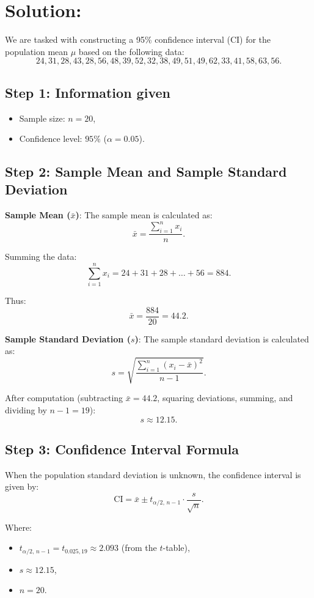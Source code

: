 \documentclass{article}
\begin{document}
\section*{Solution:}

We are tasked with constructing a 95\% confidence interval (CI) for the population mean \(\mu\) based on the following data:
\[
24, 31, 28, 43, 28, 56, 48, 39, 52, 32, 38, 49, 51, 49, 62, 33, 41, 58, 63, 56.
\]

\subsection*{Step 1: Information given}
\begin{itemize}
    \item Sample size: \(n = 20\),
    \item Confidence level: \(95\%\) (\(\alpha = 0.05\)).
\end{itemize}

\subsection*{Step 2: Sample Mean and Sample Standard Deviation}
\textbf{Sample Mean (\(\bar{x}\))}: The sample mean is calculated as:
\[
\bar{x} = \frac{\sum_{i=1}^{n} x_i}{n}.
\]

Summing the data:
\[
\sum_{i=1}^{n} x_i = 24 + 31 + 28 + \dots + 56 = 884.
\]

Thus:
\[
\bar{x} = \frac{884}{20} = 44.2.
\]

\textbf{Sample Standard Deviation (\(s\))}: The sample standard deviation is calculated as:
\[
s = \sqrt{\frac{\sum_{i=1}^{n} (x_i - \bar{x})^2}{n - 1}}.
\]

After computation (subtracting \(\bar{x} = 44.2\), squaring deviations, summing, and dividing by \(n-1 = 19\)):
\[
s \approx 12.15.
\]

\subsection*{Step 3: Confidence Interval Formula}
When the population standard deviation is unknown, the confidence interval is given by:
\[
\text{CI} = \bar{x} \pm t_{\alpha/2, \, n-1} \cdot \frac{s}{\sqrt{n}}.
\]

Where:
\begin{itemize}
    \item \(t_{\alpha/2, \, n-1} = t_{0.025, 19} \approx 2.093\) (from the \(t\)-table),
    \item \(s \approx 12.15\),
    \item \(n = 20\).
\end{itemize}
\end{document}
